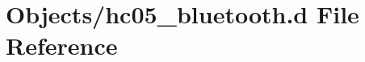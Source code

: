 \hypertarget{hc05__bluetooth_8d}{}\section{Objects/hc05\+\_\+bluetooth.d File Reference}
\label{hc05__bluetooth_8d}
